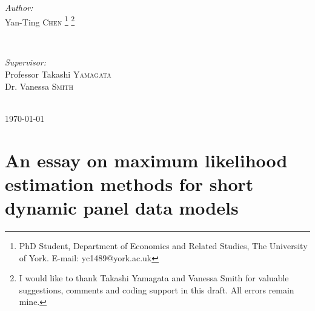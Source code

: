 \documentclass[12pt,a4paper,hyperref]{article}
\begin{document}
\begin{titlepage}

\begin{minipage}{0.4\textwidth}
\begin{flushleft} \normalsize
\emph{Author:}\\
Yan-Ting \textsc{Chen} \thanks{PhD Student, Department of Economics and Related Studies, The University of York. E-mail: yc1489@york.ac.uk} \thanks{I would like to thank Takashi Yamagata and Vanessa Smith for valuable suggestions, comments and coding support in this draft. All errors remain mine. } %
\end{flushleft}
\end{minipage}
~
\begin{minipage}{0.4\textwidth}
\begin{flushright} \normalsize
\emph{Supervisor:} \\
Professor Takashi \textsc{Yamagata} \\
Dr. Vanessa \textsc{Smith}   %
\end{flushright}
\end{minipage}\\[2cm]



{\large \today}\\[2cm] %


\vfill %

\end{titlepage}

\newpage
\tableofcontents
\newpage
\section{An essay on maximum likelihood estimation methods for short dynamic panel data models}
\end{document}
